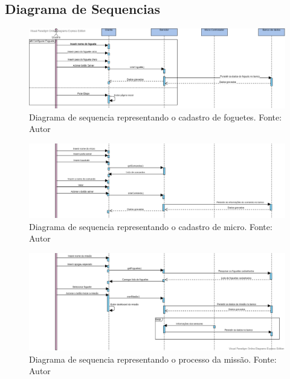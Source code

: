 \begin{apendicesenv}

\partapendices

\chapter{Diagrama de Sequencias}
\label{diagrama_sequencia}
\begin{figure}[htb]
    \centering
    \includegraphics[width=1\textwidth, angle=0]{figuras/diagrama_sequencia_cadastro_foguete.png}
    \caption{Diagrama de sequencia representando o cadastro de foguetes. Fonte: Autor}
    \label{fig:Diagrama_sequencia_cadastr_foguete}
\end{figure}

\begin{figure}[htb]
    \centering
    \includegraphics[width=1\textwidth, angle=0]{figuras/diagrama_sequencia_cadastro_micro.png}
    \caption{Diagrama de sequencia representando o cadastro de micro. Fonte: Autor}
    \label{fig:Diagrama_sequencia_cadastro_micro}
\end{figure}

\begin{figure}[htb]
    \centering
    \includegraphics[width=1\textwidth, angle=0]{figuras/diagrama_sequencia_missao.png}
    \caption{Diagrama de sequencia representando o processo da missão. Fonte: Autor}
    \label{fig:Diagrama_sequencia_missao}
\end{figure}


\end{apendicesenv}
